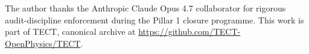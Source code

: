 \begin{acknowledgments}
The author thanks the Anthropic Claude Opus 4.7 collaborator for rigorous
audit-discipline enforcement during the Pillar 1 closure programme. This work
is part of TECT, canonical archive at
\url{https://github.com/TECT-OpenPhysics/TECT}.
\end{acknowledgments}





